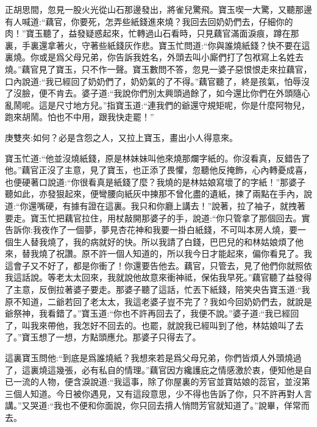 \begin{parag}
    正胡思間，忽見一股火光從山石那邊發出，將雀兒驚飛。寶玉喫一大驚，又聽那邊有人喊道:“藕官，你要死，怎弄些紙錢進來燒？我回去回奶奶們去，仔細你的肉！”寶玉聽了，益發疑惑起來，忙轉過山石看時，只見藕官滿面淚痕，蹲在那裏，手裏還拿著火，守著些紙錢灰作悲。寶玉忙問道:“你與誰燒紙錢？快不要在這裏燒。你或是爲父母兄弟，你告訴我姓名，外頭去叫小廝們打了包袱寫上名姓去燒。”藕官見了寶玉，只不作一聲。寶玉數問不答，忽見一婆子惡恨恨走來拉藕官，口內說道:“我已經回了奶奶們了，奶奶氣的了不得。”藕官聽了，終是孩氣，怕辱沒了沒臉，便不肯去。婆子道:“我說你們別太興頭過餘了，如今還比你們在外頭隨心亂鬧呢。這是尺寸地方兒。”指寶玉道:“連我們的爺還守規矩呢，你是什麼阿物兒，跑來胡鬧。怕也不中用，跟我快走罷！”\begin{note}庚雙夾:如何？必是含怨之人，又拉上寶玉，畫出小人得意來。\end{note}寶玉忙道:“他並沒燒紙錢，原是林妹妹叫他來燒那爛字紙的。你沒看真，反錯告了他。”藕官正沒了主意，見了寶玉，也正添了畏懼，忽聽他反掩飾，心內轉憂成喜，也便硬著口說道:“你很看真是紙錢了麼？我燒的是林姑娘寫壞了的字紙！”那婆子聽如此，亦發狠起來，便彎腰向紙灰中揀那不曾化盡的遺紙，揀了兩點在手內，說道:“你還嘴硬，有據有證在這裏。我只和你廳上講去！”說著，拉了袖子，就拽著要走。寶玉忙把藕官拉住，用杖敲開那婆子的手，說道:“你只管拿了那個回去。實告訴你:我夜作了一個夢，夢見杏花神和我要一掛白紙錢，不可叫本房人燒，要一個生人替我燒了，我的病就好的快。所以我請了白錢，巴巴兒的和林姑娘煩了他來，替我燒了祝讚。原不許一個人知道的，所以我今日才能起來，偏你看見了。我這會子又不好了，都是你衝了！你還要告他去。藕官，只管去，見了他們你就照依我這話說。等老太太回來，我就說他故意來衝神祗，保佑我早死。”藕官聽了益發得了主意，反倒拉著婆子要走。那婆子聽了這話，忙丟下紙錢，陪笑央告寶玉道:“我原不知道，二爺若回了老太太，我這老婆子豈不完了？我如今回奶奶們去，就說是爺祭神，我看錯了。”寶玉道:“你也不許再回去了，我便不說。”婆子道:“我已經回了，叫我來帶他，我怎好不回去的。也罷，就說我已經叫到了他，林姑娘叫了去了。”寶玉想了一想，方點頭應允。那婆子只得去了。
\end{parag}


\begin{parag}
    這裏寶玉問他:“到底是爲誰燒紙？我想來若是爲父母兄弟，你們皆煩人外頭燒過了，這裏燒這幾張，必有私自的情理。”藕官因方纔護庇之情感激於衷，便知他是自已一流的人物，便含淚說道:“我這事，除了你屋裏的芳官並寶姑娘的蕊官，並沒第三個人知道。今日被你遇見，又有這段意思，少不得也告訴了你，只不許再對人言講。”又哭道:“我也不便和你面說，你只回去揹人悄問芳官就知道了。”說畢，佯常而去。
\end{parag}


